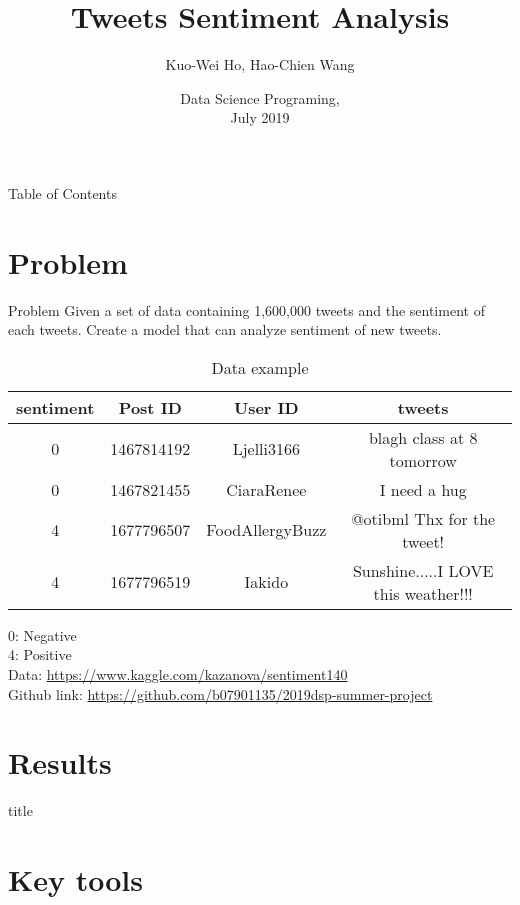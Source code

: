 \documentclass{beamer}
\title{Tweets Sentiment Analysis}
\author{Kuo-Wei Ho\inst{1}, Hao-Chien Wang\inst{2}}
\institute[NTU]
{
	\inst{1}
	NTUEE
	\and
	\inst{2}
	NTUPhys
}
\date[DSP 2019]
{Data Science Programing,\\July 2019}
\begin{document}
\frame{\titlepage}

\begin{frame}{Table of Contents}
	\tableofcontents
\end{frame}


\section{Problem}%
\label{sec:problem}

\begin{frame}{Problem}
	Given a set of data containing 1,600,000 tweets and the sentiment of each tweets. Create a model that can analyze sentiment of new tweets.\\
	\begin{table}[htpb]
		\tiny
		\centering
		\caption{Data example}
		\label{tab:data}
		\begin{tabular}{c c c c}
			sentiment & Post ID & User ID & tweets \\
			\hline
			 0 & 1467814192 & Ljelli3166 & blagh class at 8 tomorrow  \\
			 0 & 1467821455 & CiaraRenee & I need a hug  \\
			 4 & 1677796507 & FoodAllergyBuzz & @otibml Thx for the tweet!  \\
			 4 & 1677796519 & Iakido & Sunshine.....I LOVE this weather!!!  \\
		\end{tabular}
	\end{table}
	0: Negative \\
	4: Positive \\
	{\scriptsize Data: \url{https://www.kaggle.com/kazanova/sentiment140}} \\
	{\scriptsize Github link: \url{https://github.com/b07901135/2019dsp-summer-project}}
\end{frame}

\section{Results}%
\label{sec:results}

\begin{frame}{title}

\end{frame}

\section{Key tools}%
\label{sec:key_tools}
\end{document}
